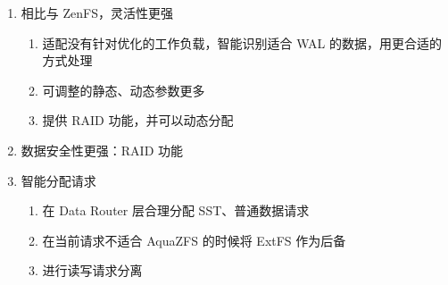 \begin{enumerate}
    \item 相比与 ZenFS，灵活性更强
    \begin{enumerate}
        \item 适配没有针对优化的工作负载，智能识别适合 WAL 的数据，用更合适的方式处理
        \item 可调整的静态、动态参数更多
        \item 提供 RAID 功能，并可以动态分配
    \end{enumerate}
    \item 数据安全性更强：RAID 功能
    \item 智能分配请求
    \begin{enumerate}
        \item 在 Data Router 层合理分配 SST、普通数据请求
        \item 在当前请求不适合 AquaZFS 的时候将 ExtFS 作为后备
        \item 进行读写请求分离
    \end{enumerate}
\end{enumerate}

